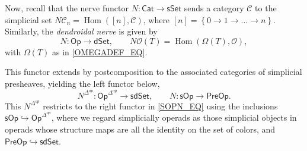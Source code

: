 \documentclass[a4paper,10pt
,draft
]{article}%
\numberwithin{equation}{section}
\numberwithin{figure}{section}
\theoremstyle{definition} %
\newtheorem{remark}[equation]{Remark}%
\newcommand{\set}[1]{\left\{#1\right\}}%
\newcommand{\sSet}{\ensuremath{\mathsf{sSet}}}%
\newcommand{\Cat}{\mathsf{Cat}}
\newcommand{\Op}{\mathsf{Op}}%
\newcommand{\sOp}{\ensuremath{\mathsf{sOp}}}%
\newcommand{\dSet}{\mathsf{dSet}}
\newcommand{\sdSet}{\mathsf{sdSet}}
\newcommand{\PreOp}{\mathsf{PreOp}}
\DeclareMathOperator{\Hom}{Hom}%
\renewcommand{\O}{\ensuremath{\mathcal O}}
\newcommand{\1}{\ensuremath{\mathbbm 1}}%
\begin{document}


Now, recall that the nerve functor
$N \colon \Cat \to \sSet$
sends a category $\mathcal C$ to the simplicial set
$N \mathcal C_n = \Hom([n], \mathcal C)$,
where $[n] = \set{0 \to 1 \to \dots \to n}$.
%
Similarly, the \textit{dendroidal nerve} is given by
\begin{equation}
        \label{OPN_EQ}
        N \colon \Op \to \dSet,
        \qquad
        N\O(T) = \Hom(\Omega(T), \O),
\end{equation}
with $\Omega(T)$ as in \eqref{OMEGADEF_EQ}.

This functor extends by postcomposition to the associated categories of simplicial presheaves,
yielding the left functor below,
\begin{equation}
        \label{SOPN_EQ}
        N^{\Delta^{op}} \colon \Op^{\Delta^{op}} \to \sdSet,
        \qquad
        N \colon \sOp \to \PreOp.
\end{equation}
This $N^{\Delta^{op}}$ restricts to the right functor in \eqref{SOPN_EQ}
using the inclusions
$\sOp \hookrightarrow \Op^{\Delta^{op}}$,
where we regard simplicially operads as those simplicial objects in operads whose
structure maps are all the identity on the set of colors,
and $\mathsf{PreOp} \hookrightarrow \sdSet$.
\end{document}
